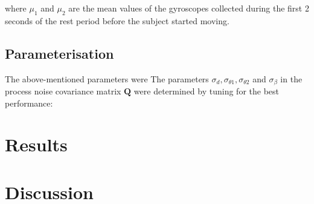\noindent
where $\mu_1$ and $\mu_2$ are the mean values of the gyroscopes collected during the first 2 seconds of the rest period before the subject started moving.

\subsection{Parameterisation}

The above-mentioned parameters were The parameters $\sigma_d, \sigma_{\theta 1}, \sigma_{\theta 2}$ and $\sigma_{\beta}$ in the process noise covariance matrix $\mathbf{Q}$ were determined by tuning for the best performance:



\section{Results}

\section{Discussion}

